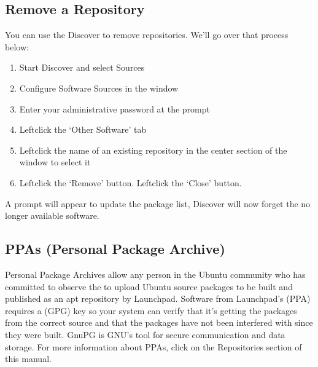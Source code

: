 \documentclass[letterpaper,10pt,english]{sphinxmanual}
\begin{document}
\subsection{Remove a Repository}
\label{\detokenize{docs/repositories:remove-a-repository}}
\sphinxAtStartPar
You can use the Discover to remove repositories. We’ll go over that process below:
\begin{enumerate}
%
\item {} 
\sphinxAtStartPar
Start Discover and select Sources

\item {} 
\sphinxAtStartPar
Configure Software Sources in the window

\item {} 
\sphinxAtStartPar
Enter your administrative password at the prompt

\item {} 
\sphinxAtStartPar
Left\sphinxhyphen{}click the ‘Other Software’ tab

\item {} 
\sphinxAtStartPar
Left\sphinxhyphen{}click the name of an existing repository in the center section of the window to select it

\item {} 
\sphinxAtStartPar
Left\sphinxhyphen{}click the ‘Remove’ button. Left\sphinxhyphen{}click the ‘Close’ button.

\end{enumerate}

\sphinxAtStartPar
A prompt will appear to update the package list, Discover will now forget the no longer available software.


\subsection{PPAs (Personal Package Archive)}
\label{\detokenize{docs/repositories:ppas-personal-package-archive}}
\sphinxAtStartPar
Personal Package Archives allow any person in the Ubuntu community who has committed to observe the  to upload Ubuntu source packages to be built and published as an apt repository by Launchpad. Software from Launchpad’s  (PPA) requires a  (GPG) key so your system can verify that it’s getting the packages from the correct source and that the packages have not been interfered with since they were built. GnuPG is GNU’s tool for secure communication and data storage. For more information about PPAs, click on the Repositories section of this manual.
\end{document}
